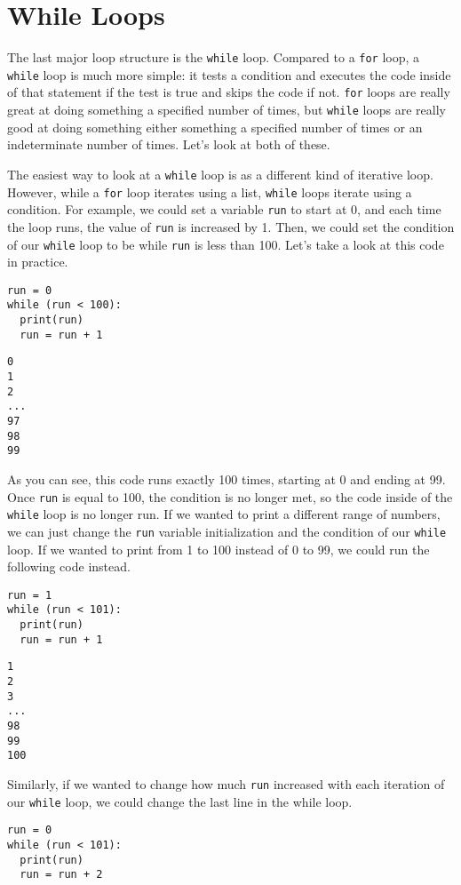 \section{While Loops}
The last major loop structure is the \verb|while| loop. Compared to a \verb|for| loop, a \verb|while| loop is much more simple: it tests a condition and executes the code inside of that statement if the test is true and skips the code if not. \verb|for| loops are really great at doing something a specified number of times, but \verb|while| loops are really good at doing something either something a specified number of times or an indeterminate number of times. Let's look at both of these.\par
The easiest way to look at a \verb|while| loop is as a different kind of iterative loop. However, while a \verb|for| loop iterates using a list, \verb|while| loops iterate using a condition. For example, we could set a variable \verb|run| to start at 0, and each time the loop runs, the value of \verb|run| is increased by 1. Then, we could set the condition of our \verb|while| loop to be while \verb|run| is less than 100. Let's take a look at this code in practice.\par
\begin{lstlisting}[style=pippython]
run = 0
while (run < 100):
  print(run)
  run = run + 1
\end{lstlisting}
\begin{lstlisting}
0
1
2
...
97
98
99
\end{lstlisting}
As you can see, this code runs exactly 100 times, starting at 0 and ending at 99. Once \verb|run| is equal to 100, the condition is no longer met, so the code inside of the \verb|while| loop is no longer run. If we wanted to print a different range of numbers, we can just change the \verb|run| variable initialization and the condition of our \verb|while| loop. If we wanted to print from 1 to 100 instead of 0 to 99, we could run the following code instead.\par
\begin{lstlisting}[style=pippython]
run = 1
while (run < 101):
  print(run)
  run = run + 1
\end{lstlisting}
\begin{lstlisting}
1
2
3
...
98
99
100
\end{lstlisting}
Similarly, if we wanted to change how much \verb|run| increased with each iteration of our \verb|while| loop, we could change the last line in the while loop.\par
\begin{lstlisting}[style=pippython]
run = 0
while (run < 101):
  print(run)
  run = run + 2
\end{lstlisting}
